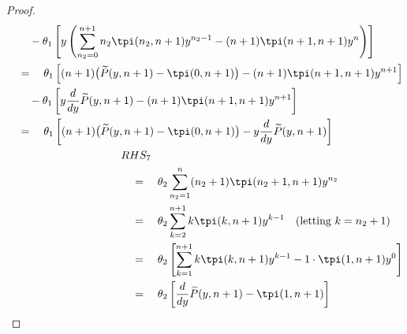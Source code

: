 \begin{proof}
\begin{align}
\begin{split}
            & \quad \quad - \theta_1 \left[ y \left( \sum_{n_2=0}^{n+1} n_2 \tpi(n_2,n+1) y^{n_2-1} - (n+1) \tpi(n+1,n+1) y^n \right) \right] \\
            & \quad = \quad \theta_1 \left[ (n+1) \big( \widetilde{P}(y,n+1) - \tpi(0,n+1) \big) - (n+1) \tpi(n+1,n+1) y^{n+1} \right] \\
            & \quad \quad - \theta_1 \left[ y \frac{d}{dy} \widetilde{P}(y,n+1) - (n+1) \tpi(n+1,n+1) y^{n+1} \right] \\
            & \quad = \quad \theta_1 \left[ (n+1) \big( \widetilde{P}(y,n+1) - \tpi(0,n+1) \big) - y \frac{d}{dy} \widetilde{P}(y,n+1) \right]
        \end{split} \\
        \begin{split}
            & RHS_7 \\
            & \quad = \quad \theta_2 \sum_{n_2=1}^{n} (n_2+1) \tpi(n_2+1,n+1) y^{n_2} \\
            & \quad = \quad \theta_2 \sum_{k=2}^{n+1} k \tpi(k,n+1) y^{k-1} \quad \text{(letting $k = n_2+1$)} \\
            & \quad = \quad \theta_2 \left[ \sum_{k=1}^{n+1} k \tpi(k,n+1) y^{k-1} - 1 \cdot \tpi(1,n+1) y^0 \right] \\
            & \quad = \quad \theta_2 \left[ \frac{d}{dy} \widetilde{P}(y,n+1) - \tpi(1,n+1) \right]
        \end{split}
    \end{align}
    

\end{proof}
